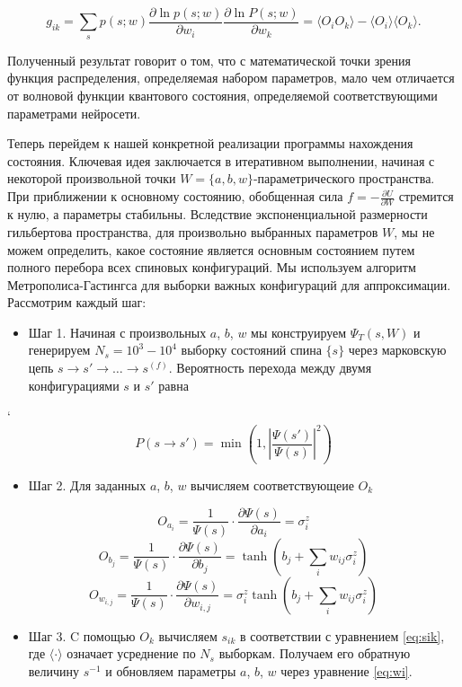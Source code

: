     \[
    g_{ik} = \sum_s p(s; w) \frac{\partial \ln p(s; w)}{\partial w_i} \frac{\partial \ln P(s; w)}{\partial w_k} =  \langle O_i O_k \rangle - \langle O_i \rangle \langle O_k \rangle.
    \]
    
    Полученный результат говорит о том, что с математической точки зрения функция распределения, определяемая набором параметров, мало чем отличается от волновой функции квантового состояния, определяемой соответствующими параметрами нейросети.
    
    Теперь перейдем к нашей конкретной реализации программы нахождения состояния. Ключевая идея заключается в итеративном выполнении, начиная с некоторой произвольной точки $W = \{a, b, w\}$-параметрического пространства. При приближении к  основному состоянию, обобщенная сила $f = - \frac{\partial U}{\partial W}$ стремится к нулю, а параметры стабильны. Вследствие экспоненциальной размерности гильбертова пространства, для произвольно выбранных параметров $W$, мы не можем определить, какое состояние является основным состоянием путем полного перебора всех спиновых конфигураций. Мы используем алгоритм Метрополиса-Гастингса для выборки важных конфигураций для аппроксимации. Рассмотрим каждый шаг:
    \begin{itemize}
        \item Шаг 1. Начиная с произвольных $a$, $b$, $w$ мы конструируем $\Psi_T (s, W)$ и генерируем $N_s = 10^3 - 10^4$ выборку состояний спина $\{s\}$ через марковскую цепь $s \rightarrow s' \rightarrow \ldots \rightarrow s^{(f)}$. Вероятность перехода между двумя конфигурациями $s$ и $s'$ равна
    \end{itemize}
    `
    \[
        P(s \rightarrow s') = \min \left(1, \left|\frac{\Psi(s')}{\Psi(s)}\right|^2 \right)
    \]
    
    \begin{itemize}
        \item Шаг 2. Для заданных $a$, $b$, $w$ вычисляем соответствующеие \( O_k \)
    \end{itemize}
    \[
        O_{a_i} = \frac{1}{\Psi(s)} \cdot \frac{\partial \Psi(s)}{\partial a_i} = \sigma_i^z
    \]
    \[
        O_{b_j} = \frac{1}{\Psi(s)} \cdot \frac{\partial \Psi(s)}{\partial b_j} = \tanh(b_j + \sum_i w_{ij} \sigma_i^z)
    \]
    \[
        O_{w_{i,j}} = \frac{1}{\Psi(s)} \cdot \frac{\partial \Psi(s)}{\partial w_{i,j}} = \sigma_i^z \tanh(b_j + \sum_i w_{ij} \sigma_i^z)
    \]
    
    \begin{itemize}
        \item  Шаг 3. C помощью $O_k$ вычисляем $s_{ik}$ в соответствии с уравнением \eqref{eq:sik}, где $\langle\cdot\rangle$ означает усреднение по $N_s$ выборкам. Получаем его обратную величину $s^{-1}$ и обновляем параметры $a$, $b$, $w$ через уравнение \eqref{eq:wi}.
    \end{itemize}
    
